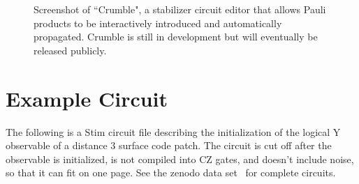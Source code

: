 \documentclass[onecolumn,unpublished,a4paper]{quantumarticle}
\theoremstyle{definition}
\theoremstyle{definition}
\theoremstyle{definition}
\begin{document}
\begin{figure}
    \centering
    \caption{
        Screenshot of ``Crumble", a stabilizer circuit editor that allows Pauli products to be interactively introduced and automatically propagated.
        Crumble is still in development but will eventually be released publicly.
    }
    \label{fig:crumble}
\end{figure}



\clearpage
\section{Example Circuit}
\label{app:example_circuit}

The following is a Stim circuit file \cite{stimcircuitformat} describing the initialization of the logical Y observable of a distance 3 surface code patch.
The circuit is cut off after the observable is initialized, is not compiled into CZ gates, and doesn't include noise, so that it can fit on one page.
See the zenodo data set~\cite{gidneyybasisdata2022} for complete circuits.
\end{document}
